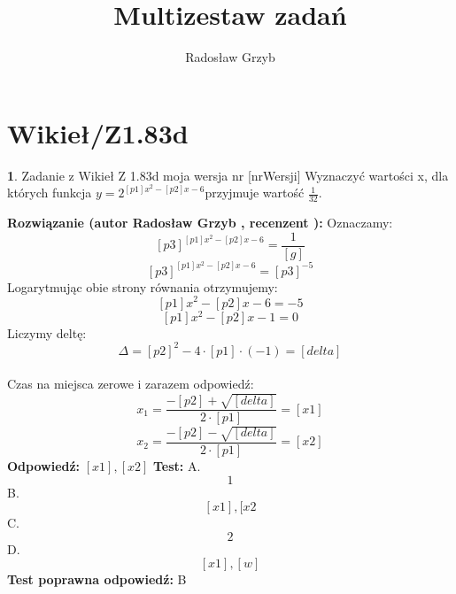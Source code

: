 \documentclass[12pt, a4paper]{article}
\title{Multizestaw zadań}
\author{Radosław Grzyb}
\date{}
\theoremstyle{definition} %
\newtheorem{zad}{}
\newcommand{\kategoria}[1]{\section{#1}} %
\newcommand{\zadStart}[1]{\begin{zad}#1\newline} %
\newcommand{\zadStop}{\end{zad}}   %
\newcommand{\rozwStart}[2]{\noindent \textbf{Rozwiązanie (autor #1 , recenzent #2): }\newline} %
\newcommand{\rozwStop}{\newline}                                            %
\newcommand{\odpStart}{\noindent \textbf{Odpowiedź:}\newline}    %
\newcommand{\odpStop}{\newline}                                             %
\newcommand{\testStart}{\noindent \textbf{Test:}\newline} %
\newcommand{\testStop}{\newline} %
\newcommand{\kluczStart}{\noindent \textbf{Test poprawna odpowiedź:}\newline} %
\newcommand{\kluczStop}{\newline} %
\begin{document}
\maketitle
\kategoria{Wikieł/Z1.83d}
\zadStart{Zadanie z Wikieł Z 1.83d moja wersja nr [nrWersji]}
Wyznaczyć wartości x, dla których funkcja $y=2^{[p1]x^{2}-[p2]x-6}$przyjmuje wartość $\frac{1}{32}$.
\zadStop
\rozwStart{Radosław Grzyb}{}
Oznaczamy:
$$[p3]^{[p1]x^{2}-[p2]x-6}=\frac{1}{[g]}$$
$$[p3]^{[p1]x^{2}-[p2]x-6}=[p3]^{-5}$$
Logarytmując obie strony równania otrzymujemy:\\
$$[p1]x^{2}-[p2]x-6=-5$$
$$[p1]x^{2}-[p2]x-1=0$$
Liczymy deltę:\\
$$\Delta=[p2]^2-4\cdot[p1]\cdot(-1)=[delta]$$\\
Czas na miejsca zerowe i zarazem odpowiedź:
$$x_{1}=\frac{-[p2]+\sqrt{[delta]}}{2\cdot[p1]}=[x1]$$
$$x_{2}=\frac{-[p2]-\sqrt{[delta]}}{2\cdot[p1]}=[x2]$$
\rozwStop
\odpStart
$[x1],[x2]$
\odpStop
\testStart
A.$$1$$
B.$$[x1],[x2$$
C.$$2$$
D.$$[x1],[w]$$
\testStop
\kluczStart
B
\kluczStop
\end{document}
